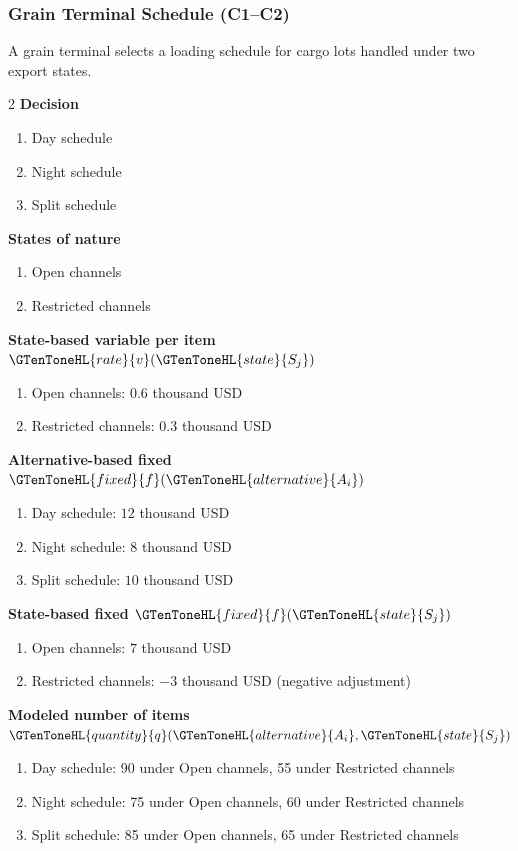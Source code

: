 	\subsubsection{Grain Terminal Schedule (C1--C2)}
	\label{sec:problem33-grain-terminal-schedule-c1-c2}
	A grain terminal selects a loading schedule for cargo lots handled under two export states.
	\begin{multicols}{2}
	\textbf{Decision }
	\begin{enumerate}[label=\arabic*.]
\item Day schedule
\item Night schedule
\item Split schedule
	\end{enumerate}
	\textbf{States of nature}
	\begin{enumerate}[label=\arabic*.]
\item Open channels
\item Restricted channels
	\end{enumerate}
	\columnbreak
	\textbf{State-based variable  per item $\GTenToneHL{rate}{v}(\GTenToneHL{state}{S_j})$}
\begin{enumerate}[label=\arabic*.]
\item Open channels: $0.6$ thousand USD
\item Restricted channels: $0.3$ thousand USD\end{enumerate}
\textbf{Alternative-based fixed  $\GTenToneHL{fixed}{f}(\GTenToneHL{alternative}{A_i})$}
\begin{enumerate}[label=\arabic*.]
\item Day schedule: $12$ thousand USD
\item Night schedule: $8$ thousand USD
\item Split schedule: $10$ thousand USD\end{enumerate}
\textbf{State-based fixed  $\GTenToneHL{fixed}{f}(\GTenToneHL{state}{S_j})$}
\begin{enumerate}[label=\arabic*.]
\item Open channels: $7$ thousand USD
\item Restricted channels: $-3$ thousand USD (negative adjustment)\end{enumerate}
\textbf{Modeled number of items $\GTenToneHL{quantity}{q}(\GTenToneHL{alternative}{A_i},\GTenToneHL{state}{S_j})$}
\begin{enumerate}[label=\arabic*.]
\item Day schedule: 90 under Open channels, 55 under Restricted channels
\item Night schedule: 75 under Open channels, 60 under Restricted channels
\item Split schedule: 85 under Open channels, 65 under Restricted channels
\end{enumerate}
	\end{multicols}


